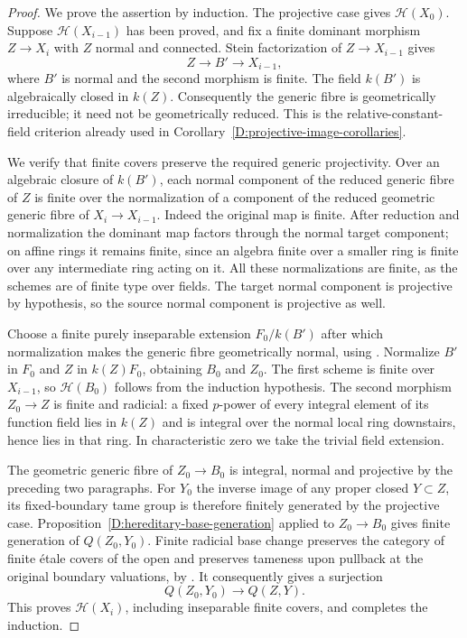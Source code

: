 \begin{proof}
We prove the assertion by induction.  The projective case
gives $\mathcal H(X_0)$.  Suppose $\mathcal H(X_{i-1})$
has been proved, and fix a finite dominant morphism
$Z\to X_i$ with $Z$ normal and connected.  Stein factorization
of $Z\to X_{i-1}$ gives
\[
                 Z\longrightarrow B'\longrightarrow X_{i-1},
\]
where $B'$ is normal and the second morphism is finite.
The field $k(B')$ is algebraically closed in $k(Z)$.
Consequently the generic fibre is geometrically irreducible;
it need not be geometrically reduced.  This is the
relative-constant-field criterion already used in
Corollary~\ref{D:projective-image-corollaries}.

We verify that finite covers preserve the required generic
projectivity.  Over an algebraic closure of $k(B')$, each
normal component of the reduced generic fibre of $Z$
is finite over the normalization of a component of the
reduced geometric generic fibre of $X_i\to X_{i-1}$.
Indeed the original map is finite.  After reduction and
normalization the dominant map factors through the normal
target component; on affine rings it remains finite, since
an algebra finite over a smaller ring is finite over any
intermediate ring acting on it.  All these normalizations
are finite, as the schemes are of finite type over fields.
The target normal component is projective by hypothesis,
so the source normal component is projective as well.

Choose a finite purely inseparable extension $F_0/k(B')$
after which normalization makes the generic fibre
geometrically normal, using
\cite[Lemma 33.27.4, tag 0BXT]{C_StacksLogFibration}.
Normalize $B'$ in $F_0$ and $Z$ in $k(Z)F_0$, obtaining
$B_0$ and $Z_0$.  The first scheme is finite over $X_{i-1}$,
so $\mathcal H(B_0)$ follows from the induction hypothesis.
The second morphism $Z_0\to Z$ is finite and radicial:
a fixed $p$-power of every integral element of its function
field lies in $k(Z)$ and is integral over the normal local
ring downstairs, hence lies in that ring.  In characteristic
zero we take the trivial field extension.

The geometric generic fibre of $Z_0\to B_0$ is integral,
normal and projective by the preceding two paragraphs.
For $Y_0$ the inverse image of any proper closed $Y\subset Z$,
its fixed-boundary tame group is therefore finitely generated
by the projective case.  Proposition~\ref{D:hereditary-base-generation}
applied to $Z_0\to B_0$ gives finite generation of $Q(Z_0,Y_0)$.
Finite radicial base change preserves the category of finite
\'etale covers of the open and preserves tameness upon pullback
at the original boundary valuations, by
\cite[tags 04DY and 0EXY]{C_StacksLogFibration}.
It consequently gives a surjection
\[
                         Q(Z_0,Y_0)\longrightarrow Q(Z,Y).
\]
This proves $\mathcal H(X_i)$, including inseparable finite
covers, and completes the induction.


\end{proof}
